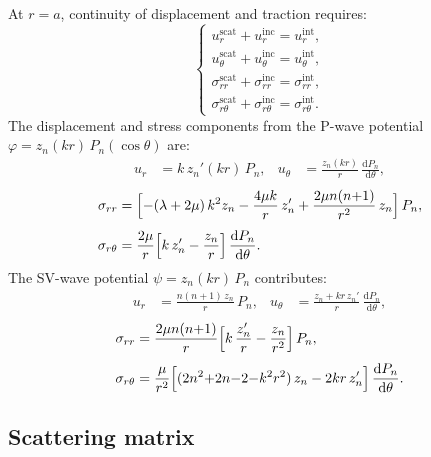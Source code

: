 \documentclass[11pt,a4paper]{article}
\newcommand{\dd}{\mathrm{d}}
\begin{document}
At $r = a$, continuity of displacement and traction requires:
\begin{equation}
  \begin{cases}
    u_r^\text{scat} + u_r^\text{inc} = u_r^\text{int}, \\[3pt]
    u_\theta^\text{scat} + u_\theta^\text{inc} = u_\theta^\text{int}, \\[3pt]
    \sigma_{rr}^\text{scat} + \sigma_{rr}^\text{inc}
      = \sigma_{rr}^\text{int}, \\[3pt]
    \sigma_{r\theta}^\text{scat} + \sigma_{r\theta}^\text{inc}
      = \sigma_{r\theta}^\text{int}.
  \end{cases}
  \label{eq:bc}
\end{equation}
The displacement and stress components from the P-wave potential
$\varphi = z_n(kr)\,P_n(\cos\theta)$ are:
\begin{align}
  u_r &= k\,z_n'(kr)\,P_n, &
  u_\theta &= \frac{z_n(kr)}{r}\,\frac{\dd P_n}{\dd\theta},
  \label{eq:ur_P}
\end{align}
\begin{align}
  \sigma_{rr} &= \Bigl[
    -(\lambda + 2\mu)\,k^2 z_n
    - \frac{4\mu k}{r}\,z_n'
    + \frac{2\mu n(n{+}1)}{r^2}\,z_n
  \Bigr]\,P_n,
  \label{eq:srr_P} \\[4pt]
  \sigma_{r\theta} &= \frac{2\mu}{r}
    \Bigl[k\,z_n' - \frac{z_n}{r}\Bigr]\,
    \frac{\dd P_n}{\dd\theta}.
  \label{eq:srt_P}
\end{align}
The SV-wave potential $\psi = z_n(kr)\,P_n$ contributes:
\begin{align}
  u_r &= \frac{n(n{+}1)\,z_n}{r}\,P_n, &
  u_\theta &= \frac{z_n + kr\,z_n'}{r}\,
    \frac{\dd P_n}{\dd\theta},
  \label{eq:ur_S}
\end{align}
\begin{align}
  \sigma_{rr} &= \frac{2\mu n(n{+}1)}{r}
    \Bigl[k\,\frac{z_n'}{r} - \frac{z_n}{r^2}\Bigr]\,P_n,
  \label{eq:srr_S} \\[4pt]
  \sigma_{r\theta} &= \frac{\mu}{r^2}
    \Bigl[(2n^2{+}2n{-}2{-}k^2r^2)\,z_n
    - 2kr\,z_n'\Bigr]\,
    \frac{\dd P_n}{\dd\theta}.
  \label{eq:srt_S}
\end{align}

\subsection{Scattering matrix}
\label{sec:mie_matrix}
\end{document}
